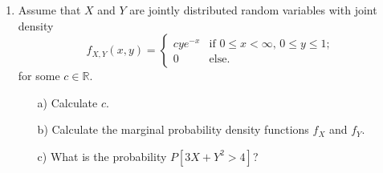 \documentclass{article}
\begin{document}
\begin{enumerate}

\item

Assume that $X$ and $Y$ are jointly distributed random variables with joint density 
\[
f_{X,Y}(x,y) = \left\{ \begin{array}{ll} cy e^{-x} & \mbox{if } 0 \leq x < \infty, \, 0 \leq y \leq 1;\\ 0  & \mbox{else}.\end{array} \right.
\]
for some $c \in \mathbb{R}$.
\begin{itemize}
	\item[a)] Calculate $c$.
	\item[b)] Calculate the marginal probability density functions $f_X$ and $f_Y$.
	\item[c)] What is the probability $P[ 3X+ Y^2 > 4]$?
\end{itemize}

\end{enumerate}
\end{document}
